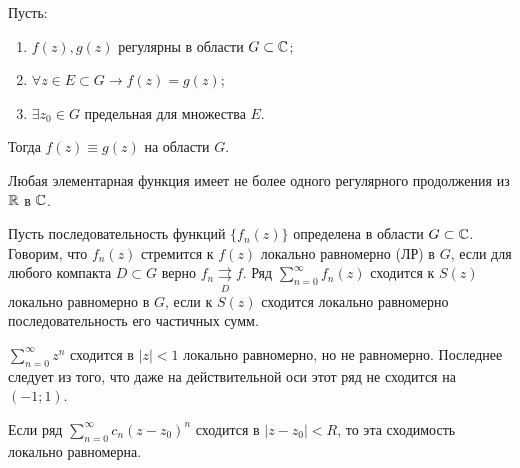 \begin{corollary}
    Пусть:
    \begin{enumerate}[wide=20pt, label=\arabic*., itemsep=0ex]
        \item \(f(z), g(z)\) регулярны в области \(G \subset \mathbb{C}\);
        \item \(\forall z \in E \subset G \rightarrow f(z) = g(z)\);
        \item \(\exists z_0 \in G\) предельная для множества \(E\).
    \end{enumerate}
    Тогда \(f(z) \equiv g(z)\) на области \(G\).
\end{corollary}

\begin{corollary}
    Любая элементарная функция имеет не более одного регулярного продолжения из \(\mathbb{R}\) в \(\mathbb{C}\).
\end{corollary}



\begin{definition}
    Пусть последовательность функций \(\{f_n(z)\}\) определена в области \(G \subset \mathbb{C}\). Говорим,
    что \(f_n(z)\) стремится к \(f(z)\) локально равномерно (ЛР) в \(G\), если для любого компакта 
    \(D \subset G\) верно \(f_n \mathrel{\mathop{\rightrightarrows}\limits_{D}} f\). Ряд 
    \(\sum\limits_{n=0}^\infty f_n(z)\) сходится к \(S(z)\) локально равномерно в \(G\), если к
    \(S(z)\) сходится локально равномерно последовательность его частичных сумм.
\end{definition}

\begin{example}
    \(\sum\limits_{n = 0}^\infty z^n\) сходится в \(|z| < 1\) локально равномерно, но не равномерно.
    Последнее следует из того, что даже на действительной оси этот ряд не сходится на \((-1; 1)\).
\end{example}

\begin{note}
    Если ряд \(\sum\limits_{n = 0}^\infty c_n(z-z_0)^n\) сходится в \(|z-z_0| < R\), то эта 
    сходимость локально равномерна.
\end{note}

